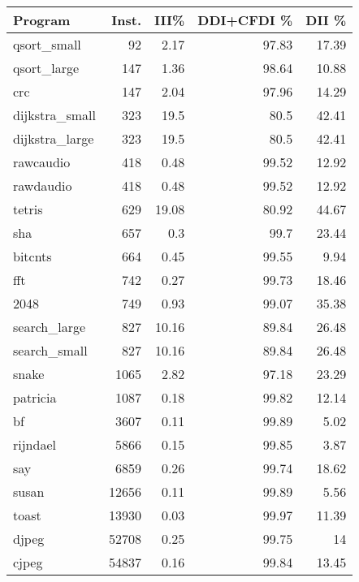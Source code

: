 \begin{tabular}{lrrrr}
\hline
 Program        &   Inst. &   III\% &   DDI+CFDI \% &   DII \% \\
\hline
 qsort\_small    &      92 &   2.17 &        97.83 &   17.39 \\
 qsort\_large    &     147 &   1.36 &        98.64 &   10.88 \\
 crc            &     147 &   2.04 &        97.96 &   14.29 \\
 dijkstra\_small &     323 &  19.5  &        80.5  &   42.41 \\
 dijkstra\_large &     323 &  19.5  &        80.5  &   42.41 \\
 rawcaudio      &     418 &   0.48 &        99.52 &   12.92 \\
 rawdaudio      &     418 &   0.48 &        99.52 &   12.92 \\
 tetris         &     629 &  19.08 &        80.92 &   44.67 \\
 sha            &     657 &   0.3  &        99.7  &   23.44 \\
 bitcnts        &     664 &   0.45 &        99.55 &    9.94 \\
 fft            &     742 &   0.27 &        99.73 &   18.46 \\
 2048           &     749 &   0.93 &        99.07 &   35.38 \\
 search\_large   &     827 &  10.16 &        89.84 &   26.48 \\
 search\_small   &     827 &  10.16 &        89.84 &   26.48 \\
 snake          &    1065 &   2.82 &        97.18 &   23.29 \\
 patricia       &    1087 &   0.18 &        99.82 &   12.14 \\
 bf             &    3607 &   0.11 &        99.89 &    5.02 \\
 rijndael       &    5866 &   0.15 &        99.85 &    3.87 \\
 say            &    6859 &   0.26 &        99.74 &   18.62 \\
 susan          &   12656 &   0.11 &        99.89 &    5.56 \\
 toast          &   13930 &   0.03 &        99.97 &   11.39 \\
 djpeg          &   52708 &   0.25 &        99.75 &   14    \\
 cjpeg          &   54837 &   0.16 &        99.84 &   13.45 \\
\hline
\end{tabular}\begin{tabular}{lrrrrrrrr}

\end{tabular}
